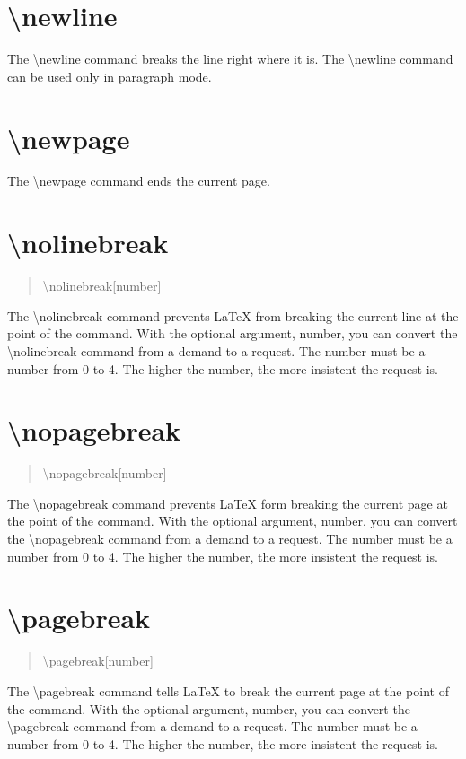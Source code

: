 \documentclass[letterpaper,twocolumn]{article}
\begin{document}
\section{\textbackslash newline}

The \textbackslash newline command breaks the line right where it is. The \textbackslash newline command can be used only in paragraph mode.
\section{\textbackslash newpage}

The \textbackslash newpage command ends the current page.
\section{\textbackslash nolinebreak}
\begin{quote}
\textbackslash nolinebreak[number]
\end{quote}
The \textbackslash nolinebreak command prevents LaTeX from breaking the current line at the point of the command. With the optional argument, number, you can convert the \textbackslash nolinebreak command from a demand to a request. The number must be a number from 0 to 4. The higher the number, the more insistent the request is.
\section{\textbackslash nopagebreak}
\begin{quote}
\textbackslash nopagebreak[number]
\end{quote}
The \textbackslash nopagebreak command prevents LaTeX form breaking the current page at the point of the command. With the optional argument, number, you can convert the \textbackslash nopagebreak command from a demand to a request. The number must be a number from 0 to 4. The higher the number, the more insistent the request is.
\section{\textbackslash pagebreak}
\begin{quote}
\textbackslash pagebreak[number]
\end{quote}
The \textbackslash pagebreak command tells LaTeX to break the current page at the point of the command. With the optional argument, number, you can convert the \textbackslash pagebreak command from a demand to a request. The number must be a number from 0 to 4. The higher the number, the more insistent the request is.
\end{document}
